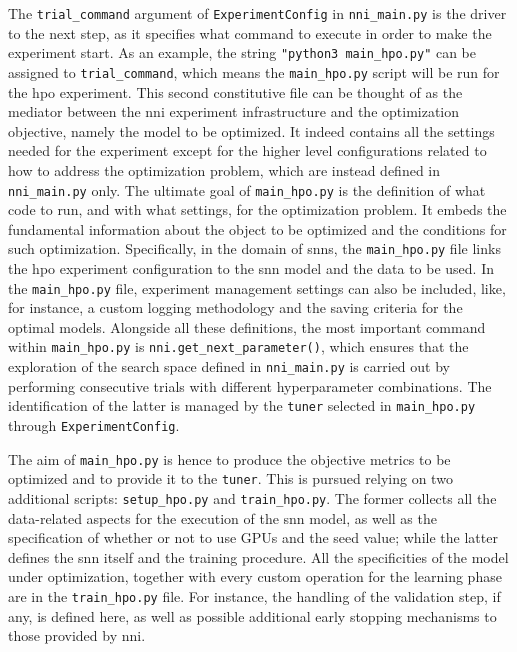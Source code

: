 The \texttt{trial\_command} argument of \texttt{ExperimentConfig} in \texttt{nni\_main.py} is the driver to the next step, as it specifies what command to execute in order to make the experiment start.
As an example, the string \texttt{"python3 main\_hpo.py"} can be assigned to \texttt{trial\_command}, which means the \texttt{main\_hpo.py} script will be run for the \gls{hpo} experiment.
This second constitutive file can be thought of as the mediator between the \gls{nni} experiment infrastructure and the optimization objective, namely the model to be optimized. It indeed contains all the settings needed for the experiment except for the higher level configurations related to how to address the optimization problem, which are instead defined in \texttt{nni\_main.py} only.
The ultimate goal of \texttt{main\_hpo.py} is the definition of what code to run, and with what settings, for the optimization problem. It embeds the fundamental information about the object to be optimized and the conditions for such optimization. Specifically, in the domain of \glspl{snn}, the \texttt{main\_hpo.py} file links the \gls{hpo} experiment configuration to the \gls{snn} model and the data to be used.
In the \texttt{main\_hpo.py} file, experiment management settings can also be included, like, for instance, a custom logging methodology and the saving criteria for the optimal models.
Alongside all these definitions, the most important command within \texttt{main\_hpo.py} is \texttt{nni.get\_next\_parameter()}, which ensures that the exploration of the search space defined in \texttt{nni\_main.py} is carried out by performing consecutive trials with different hyperparameter combinations.
The identification of the latter is managed by the \texttt{tuner} selected in \texttt{main\_hpo.py} through \texttt{ExperimentConfig}.

The aim of \texttt{main\_hpo.py} is hence to produce the objective metrics to be optimized and to provide it to the \texttt{tuner}. This is pursued relying on two additional scripts: \texttt{setup\_hpo.py} and \texttt{train\_hpo.py}.
The former collects all the data-related aspects for the execution of the \gls{snn} model, as well as the specification of whether or not to use GPUs and the seed value; while the latter defines the \gls{snn} itself and the training procedure.
All the specificities of the model under optimization, together with every custom operation for the learning phase are in the \texttt{train\_hpo.py} file.
For instance, the handling of the validation step, if any, is defined here, as well as possible additional early stopping mechanisms to those provided by \gls{nni}.

